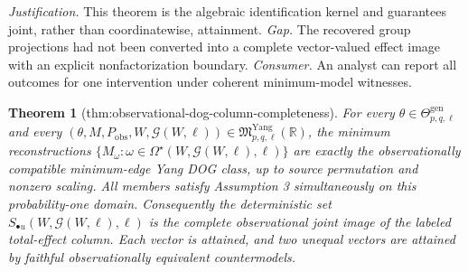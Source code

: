 \documentclass{article}
\newtheorem{theorem}{Theorem}
\begin{document}
\par\smallskip\noindent \textit{Justification.} This theorem is the algebraic identification kernel and guarantees joint, rather than coordinatewise, attainment. \textit{Gap.} The recovered group projections had not been converted into a complete vector-valued effect image with an explicit nonfactorization boundary. \textit{Consumer.} An analyst can report all outcomes for one intervention under coherent minimum-model witnesses.

\begin{theorem}[thm:observational-dog-column-completeness]\label{thm:observational-dog-column-completeness}
For every \(\theta\in\Theta_{p,q,\ell}^{\mathrm{gen}}\) and every \((\theta,M,P_{\mathrm{obs}},W,\mathcal G(W,\ell))\in\mathfrak M_{p,q,\ell}^{\mathrm{Yang}}(\mathbb R)\), the minimum reconstructions \(\{M_\omega:\omega\in\Omega^\star(W,\mathcal G(W,\ell),\ell)\}\) are exactly the observationally compatible minimum-edge Yang DOG class, up to source permutation and nonzero scaling.  All members satisfy Assumption 3 simultaneously on this probability-one domain.  Consequently the deterministic set \(S_{\bullet u}(W,\mathcal G(W,\ell),\ell)\) is the complete observational joint image of the labeled total-effect column.  Each vector is attained, and two unequal vectors are attained by faithful observationally equivalent countermodels.
\end{theorem}
\end{document}
